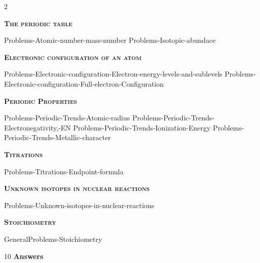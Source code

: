 \documentclass[main.tex]{subfiles}
\begin{document}
\newpage
{}
\fancyhfoffset[E,O]{0pt}
\setlength{\columnsep}{30pt}
\begin{conclusion}
\end{conclusion}
\begin{multicols*}{2}\setcounter{numA}{1}  %













\newcommand\chapterlabel{Ch-Table}
{\raggedright\textsc{\textbf{The periodic table }}\par}
{Problems-Atomic-number-mass-number}
{Problems-Isotopic-abundace}
 
\renewcommand\chapterlabel{Ch-radiation}
{\raggedright\textsc{\textbf{ Electronic configuration of an atom }}\par}
  {Problems-Electronic-configuration-Electron-energy-levels-and-sublevels}
  {Problems-Electronic-configuration-Full-electron-Configuration}
{\raggedright\textsc{\textbf{Periodic Properties }}\par}
  {Problems-Periodic-Trends-Atomic-radius}
  {Problems-Periodic-Trends-Electronegativity,-EN}
  {Problems-Periodic-Trends-Ionization-Energy}
  {Problems-Periodic-Trends-Metallic-character}

\renewcommand\chapterlabel{Ch-acidbase}
{\raggedright\textsc{\textbf{Titrations}}\par}
 {Problems-Titrations-Endpoint-formula}
 
\renewcommand\chapterlabel{Ch-nuclear}
 {\raggedright\textsc{\textbf{Unknown isotopes in nuclear reactions }}\par}
{Problems-Unknown-isotopes-in-nuclear-reactions}

\renewcommand\chapterlabel{Ch-mole}
{\raggedright\textsc{\textbf{Stoichiometry}}\par}
{GeneralProblems-Stoichiometry}

\end{multicols*}
\newpage
\begin{answersenvironment}
\begin{minipage}[c]{1\textwidth}
\begin{localsize}{10}
{\Large \bf Answers}
     \printsolutions[byID={1,3,5,7,9,11,13,15, 17,19,21,23,25 }]  
\end{localsize}
\end{minipage}\end{answersenvironment}
\end{document}

